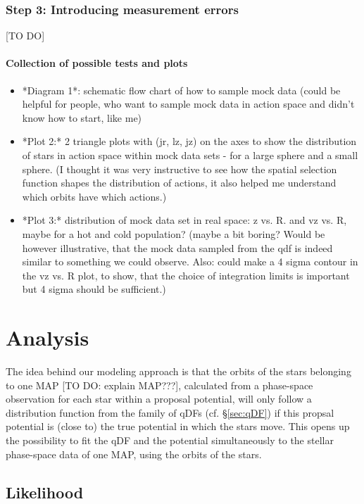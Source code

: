\documentclass[12pt,preprint]{aastex}
\begin{document}
\subsubsection{Step 3: Introducing measurement errors}

[TO DO]

\paragraph{Collection of possible tests and plots}

\begin{itemize}
\item *Diagram 1*: schematic flow chart of how to sample mock data (could be helpful for people, who want to sample mock data in action space and didn't know how to start, like me)
\item *Plot 2:* 2 triangle plots with (jr, lz, jz) on the axes to show the distribution of stars in action space within mock data sets - for a large sphere and a small sphere. (I thought it was very instructive to see how the spatial selection function shapes the distribution of actions, it also helped me understand which orbits have which actions.)
\item *Plot 3:* distribution of mock data set in real space: z vs. R. and vz vs. R, maybe for a hot and cold population? (maybe a bit boring? Would be however illustrative, that the mock data sampled from the qdf is indeed similar to something we could observe. Also: could make a 4 sigma contour in the vz vs. R plot, to show, that the choice of integration limits is important but 4 sigma should be sufficient.)
\end{itemize}

\section{Analysis}

The idea behind our modeling approach is that the orbits of the stars belonging to one MAP [TO DO: explain MAP???], calculated from a phase-space observation for each star within a proposal potential,  will only follow a distribution function from the family of qDFs (cf. \S\ref{sec:qDF}) if this propsal potential is (close to) the true potential in which the stars move. This opens up the possibility to fit the qDF and the potential simultaneously to the stellar phase-space data of one MAP, using the orbits of the stars. 

\subsection{Likelihood}
\end{document}
